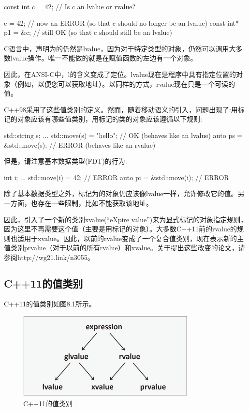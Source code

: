 \begin{cppcode}
const int c = 42; // Is c an lvalue or rvalue?

c = 42; // now an ERROR (so that c should no longer be an lvalue)
const int* p1 = &c; // still OK (so that c should still be an lvalue)
\end{cppcode}

C语言中，声明为的仍然是lvalue，因为对于特定类型的对象，仍然可以调用大多数lvalue操作。唯一不能做的就是在赋值函数的左边有一个对象。

因此，在ANSI-C中，l的含义变成了定位。lvalue现在是程序中具有指定位置的对象（例如，以便您可以获取地址）。以同样的方式，rvalue现在只是一个可读的值。

C++98采用了这些值类别的定义。然而，随着移动语义的引入，问题出现了:用标记的对象应该有哪些值类别，用标记的类的对象应该遵循以下规则:

\begin{cppcode}
std::string s;
...
std::move(s) = "hello"; // OK (behaves like an lvalue)
auto ps = &std::move(s); // ERROR (behaves like an rvalue)
\end{cppcode}

但是，请注意基本数据类型(FDT)的行为:

\begin{cppcode}
int i;
...
std::move(i) = 42; // ERROR
auto pi = &std::move(i); // ERROR
\end{cppcode}

除了基本数据类型之外，标记为的对象仍应该像lvalue一样，允许修改它的值。另一方面，也存在一些限制，比如不能获取该地址。

因此，引入了一个新的类别xvalue(“eXpire value”)来为显式标记的对象指定规则，因为这里不再需要这个值（主要是用标记的对象）。大多数C++11前的rvalue的规则也适用于xvalue。因此，以前的rvalue变成了一个复合值类别，现在表示新的主值类别prvalue（对于以前的所有rvalue）和xvalue。关于提出这些改变的论文，请参阅http://wg21.link/n3055。

\subsection{C++11的值类别}

C++11的值类别如图8.1所示。

\begin{figure}
	\includegraphics[width=0.8\textwidth]{part1/ch8/images/1}
	\caption{C++11的值类别}
\end{figure}

